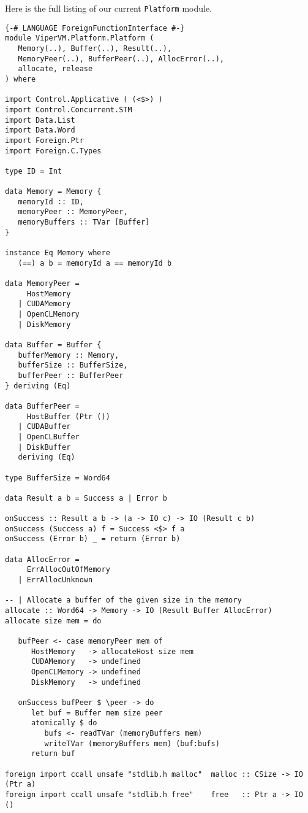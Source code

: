 Here is the full listing of our current \texttt{Platform} module.

\begin{lstlisting}
{-# LANGUAGE ForeignFunctionInterface #-}
module ViperVM.Platform.Platform (
   Memory(..), Buffer(..), Result(..),
   MemoryPeer(..), BufferPeer(..), AllocError(..),
   allocate, release
) where

import Control.Applicative ( (<$>) )
import Control.Concurrent.STM
import Data.List
import Data.Word
import Foreign.Ptr
import Foreign.C.Types

type ID = Int

data Memory = Memory {
   memoryId :: ID,
   memoryPeer :: MemoryPeer,
   memoryBuffers :: TVar [Buffer]
}

instance Eq Memory where
   (==) a b = memoryId a == memoryId b

data MemoryPeer =
     HostMemory
   | CUDAMemory
   | OpenCLMemory
   | DiskMemory

data Buffer = Buffer {
   bufferMemory :: Memory,
   bufferSize :: BufferSize,
   bufferPeer :: BufferPeer
} deriving (Eq)

data BufferPeer = 
     HostBuffer (Ptr ())
   | CUDABuffer
   | OpenCLBuffer
   | DiskBuffer
   deriving (Eq)

type BufferSize = Word64

data Result a b = Success a | Error b

onSuccess :: Result a b -> (a -> IO c) -> IO (Result c b)
onSuccess (Success a) f = Success <$> f a
onSuccess (Error b) _ = return (Error b)

data AllocError = 
     ErrAllocOutOfMemory
   | ErrAllocUnknown

-- | Allocate a buffer of the given size in the memory 
allocate :: Word64 -> Memory -> IO (Result Buffer AllocError)
allocate size mem = do

   bufPeer <- case memoryPeer mem of
      HostMemory   -> allocateHost size mem
      CUDAMemory   -> undefined
      OpenCLMemory -> undefined
      DiskMemory   -> undefined

   onSuccess bufPeer $ \peer -> do
      let buf = Buffer mem size peer
      atomically $ do
         bufs <- readTVar (memoryBuffers mem)
         writeTVar (memoryBuffers mem) (buf:bufs)
      return buf

foreign import ccall unsafe "stdlib.h malloc"  malloc :: CSize -> IO (Ptr a)
foreign import ccall unsafe "stdlib.h free"    free   :: Ptr a -> IO ()


\end{lstlisting}

